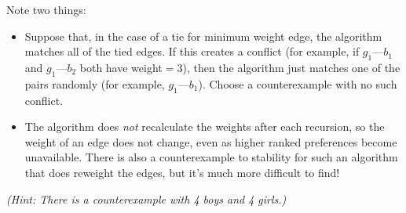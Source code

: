 \documentclass[12pt,twoside]{article}
\begin{document}
\begin{problem}{20}
\begin{problemparts}
Note two things:
\begin{itemize}
\item Suppose that, in the case of a tie for minimum weight edge, the algorithm matches all of the tied edges. If this creates a conflict (for example, if $g_1$---$b_1$ and $g_1$---$b_2$ both have weight$=3$), then the algorithm just matches one of the pairs randomly (for example, $g_1$---$b_1$). Choose a counterexample with no such conflict.
\item The algorithm does \textit{not} recalculate the weights after each recursion, so the weight of an edge does not change, even as higher ranked preferences become unavailable. There is also a counterexample to stability for such an algorithm that does reweight the edges, but it's much more difficult to find!
\end{itemize}

\textit{(Hint: There is a counterexample with 4 boys and 4 girls.)}


\end{problemparts}

\end{problem}
\instatements{\newpage}

\end{document}
